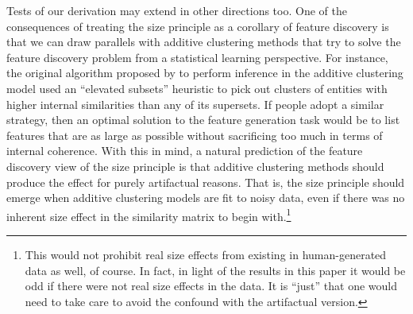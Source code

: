 \documentclass{apa}
\begin{document}

Tests of our derivation may extend in other directions too. One of the consequences of treating the size principle as a corollary of feature discovery is that we can draw parallels with additive clustering methods \cite{Shepard1979,Tenenbaum1996,Lee2001a,Navarro2008a} that try to solve the feature discovery problem from a statistical learning perspective. For instance, the original algorithm proposed by  to perform inference in the additive clustering model used an ``elevated subsets'' heuristic to pick out clusters of entities with higher internal similarities than any of its supersets. If people adopt a similar strategy, then an optimal solution to the feature generation task would be to list features that are as large as possible without sacrificing too much in terms of internal coherence. With this in mind, a natural prediction of the feature discovery view of the size principle is that additive clustering methods should produce the effect for purely artifactual reasons.
That is, the size principle should emerge when additive clustering models are fit to noisy data, even if there was no inherent size effect in the similarity matrix to begin with.\footnote{This would not prohibit real size effects from existing in human-generated data as well, of course. In fact, in light of the results in this paper it would be odd if there were not real size effects in the data. It is ``just'' that one would need to take care to avoid the confound with the artifactual version.}
\end{document}
